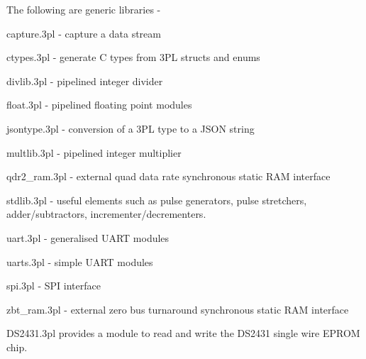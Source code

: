     The following are generic libraries -
    \blist
    \item   capture.3pl - capture a data stream
    \item   ctypes.3pl - generate C types from 3PL structs and enums
    \item   divlib.3pl - pipelined integer divider
    \item   float.3pl - pipelined floating point modules
    \item   jsontype.3pl - conversion of a 3PL type to a JSON string
    \item   multlib.3pl - pipelined integer multiplier
    \item   qdr2\_ram.3pl - external quad data rate synchronous static RAM interface
    \item   stdlib.3pl - useful elements such as pulse generators, pulse
            stretchers, adder/subtractors, incrementer/decrementers.
    \item   uart.3pl - generalised UART modules
    \item   uarts.3pl - simple UART modules
    \item   spi.3pl - SPI interface
    \item   zbt\_ram.3pl - external zero bus turnaround synchronous static RAM interface
    \blend
    
    DS2431.3pl provides a module to read and write the DS2431 single wire
    EPROM chip.
    
